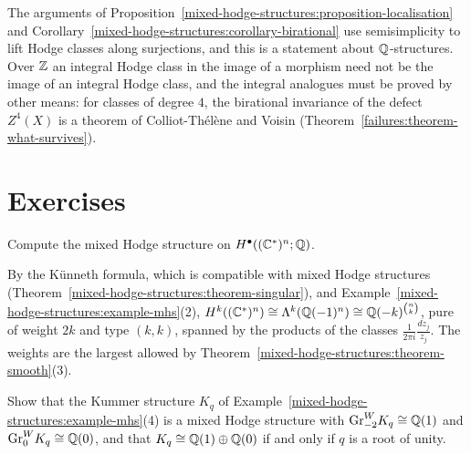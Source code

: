 \begin{remark}\label{mixed-hodge-structures:remark-integral}
The arguments of Proposition~\ref{mixed-hodge-structures:proposition-localisation} and Corollary~\ref{mixed-hodge-structures:corollary-birational} use semisimplicity to lift Hodge classes along surjections,
and this is a statement about $\mathbb{Q}$-structures. Over $\mathbb{Z}$ an integral Hodge class in the image of a morphism need not be the image of an integral Hodge class, and the integral analogues must be proved
by other means: for classes of degree $4$, the birational invariance of the defect $Z^4(X)$ is a theorem of Colliot-Th\'el\`ene and Voisin (Theorem~\ref{failures:theorem-what-survives}).
\end{remark}

\section{Exercises}\label{mixed-hodge-structures:section-exercises}

\begin{exercise}\label{mixed-hodge-structures:exercise-cstar}
Compute the mixed Hodge structure on $H^\bullet((\mathbb{C}^*)^n; \mathbb{Q})$.
\end{exercise}

\begin{solution}
By the K\"unneth formula, which is compatible with mixed Hodge structures (Theorem~\ref{mixed-hodge-structures:theorem-singular}), and Example~\ref{mixed-hodge-structures:example-mhs}(2),
$H^k((\mathbb{C}^*)^n) \cong \Lambda^k(\mathbb{Q}(-1)^n) \cong \mathbb{Q}(-k)^{\binom{n}{k}}$, pure of weight $2k$ and type $(k,k)$, spanned by the products of the classes $\frac{1}{2\pi i}\frac{dz_j}{z_j}$. The weights are the largest
allowed by Theorem~\ref{mixed-hodge-structures:theorem-smooth}(3).
\end{solution}

\begin{exercise}\label{mixed-hodge-structures:exercise-kummer}
Show that the Kummer structure $K_q$ of Example~\ref{mixed-hodge-structures:example-mhs}(4) is a mixed Hodge structure with $\mathrm{Gr}^W_{-2}K_q \cong \mathbb{Q}(1)$ and $\mathrm{Gr}^W_0K_q \cong \mathbb{Q}(0)$, and that
$K_q \cong \mathbb{Q}(1) \oplus \mathbb{Q}(0)$ if and only if $q$ is a root of unity.
\end{exercise}


